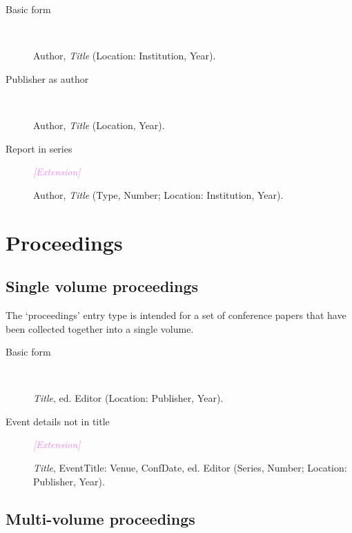 \documentclass[extrafontsizes,11pt,a4paper,oneside]{memoir}
\newcommand*{\lit}[1]{\textsf{#1}}
\newcommand*{\code}[1]{`\textsf{#1}'}
\newcommand*{\aside}[1]{\textcolor{violet}{\emph{[#1]}}}
\begin{document}
    \begin{description}
        \item[Basic form]~\par
        Author, \emph{Title} (Location: Institution, Year).
        \\
        
        \item[Publisher as author]~\par
        Author, \emph{Title} (Location, Year).
        \\
        
        \item[Report in series] \aside{Extension}\par
        Author, \emph{Title} (Type, Number; Location: Institution, Year).
    \end{description} 
    
    \section{Proceedings}\label{sec:proceedings}
    
    \subsection{Single volume proceedings}
    
    The \code{proceedings} entry type is intended for a set of conference papers that have been collected together into a single volume.
    
    \begin{description}
        \item[Basic form]~\par
        \emph{Title}, \lit{ed.} Editor (Location: Publisher, Year).
        \\
        
        \item[Event details not in title] \aside{Extension}\par
        \emph{Title}, EventTitle: Venue, ConfDate, \lit{ed.} Editor (Series, Number; Location: Publisher, Year).
        \\
    \end{description}
    
    \subsection{Multi-volume proceedings}
    
\end{document}
